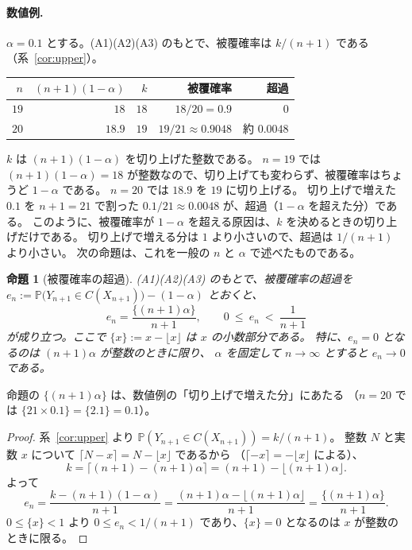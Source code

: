 \documentclass[a4paper,11pt]{jsarticle}
\theoremstyle{definition}
\theoremstyle{plain}
\newtheorem{proposition}[definition]{命題}
\theoremstyle{remark}
\newcommand{\Prob}{\mathbb{P}}
\begin{document}
\paragraph{数値例.}
$\alpha=0.1$ とする。(A1)(A2)(A3) のもとで、被覆確率は $k/(n+1)$ である（系~\ref{cor:upper}）。
\begin{center}
  \begin{tabular}{rrrrr}
    \toprule
    $n$ & $(n+1)(1-\alpha)$ & $k$ & 被覆確率 & 超過 \\
    \midrule
    $19$ & $18$ & $18$ & $18/20=0.9$ & $0$ \\
    $20$ & $18.9$ & $19$ & $19/21\approx0.9048$ & 約 $0.0048$ \\
    \bottomrule
  \end{tabular}
\end{center}
$k$ は $(n+1)(1-\alpha)$ を切り上げた整数である。
$n=19$ では $(n+1)(1-\alpha)=18$ が整数なので、切り上げても変わらず、被覆確率はちょうど
$1-\alpha$ である。
$n=20$ では $18.9$ を $19$ に切り上げる。
切り上げで増えた $0.1$ を $n+1=21$ で割った $0.1/21\approx0.0048$ が、超過（$1-\alpha$ を超えた分）である。
このように、被覆確率が $1-\alpha$ を超える原因は、$k$ を決めるときの切り上げだけである。
切り上げで増える分は $1$ より小さいので、超過は $1/(n+1)$ より小さい。
次の命題は、これを一般の $n$ と $\alpha$ で述べたものである。

\begin{proposition}[被覆確率の超過]
  \label{prop:excess}
  (A1)(A2)(A3) のもとで、被覆確率の超過を
  $e_n:=\Prob\bigl(Y_{n+1}\in C(X_{n+1})\bigr)-(1-\alpha)$ とおくと、
  \begin{equation*}
    e_n=\frac{\{(n+1)\alpha\}}{n+1},\qquad 0\ \le\ e_n\ <\ \frac{1}{n+1}
  \end{equation*}
  が成り立つ。ここで $\{x\}:=x-\lfloor x\rfloor$ は $x$ の小数部分である。
  特に、$e_n=0$ となるのは $(n+1)\alpha$ が整数のときに限り、
  $\alpha$ を固定して $n\to\infty$ とすると $e_n\to0$ である。
\end{proposition}

命題の $\{(n+1)\alpha\}$ は、数値例の「切り上げで増えた分」にあたる
（$n=20$ では $\{21\times0.1\}=\{2.1\}=0.1$）。

\begin{proof}
  系~\ref{cor:upper} より $\Prob(Y_{n+1}\in C(X_{n+1}))=k/(n+1)$。
  整数 $N$ と実数 $x$ について $\lceil N-x\rceil=N-\lfloor x\rfloor$ であるから
  （$\lceil -x\rceil=-\lfloor x\rfloor$ による）、
  \begin{equation*}
    k=\lceil (n+1)-(n+1)\alpha\rceil=(n+1)-\lfloor (n+1)\alpha\rfloor .
  \end{equation*}
  よって
  \begin{equation*}
    e_n=\frac{k-(n+1)(1-\alpha)}{n+1}
    =\frac{(n+1)\alpha-\lfloor(n+1)\alpha\rfloor}{n+1}
    =\frac{\{(n+1)\alpha\}}{n+1}.
  \end{equation*}
  $0\le\{x\}<1$ より $0\le e_n<1/(n+1)$ であり、$\{x\}=0$ となるのは
  $x$ が整数のときに限る。
\end{proof}
\end{document}
